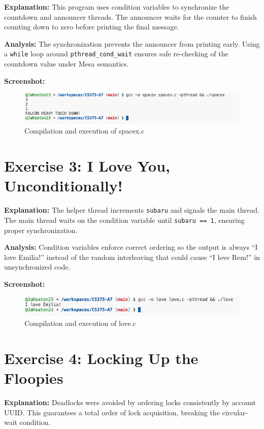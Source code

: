 \documentclass[a4paper,12pt]{article}
\begin{document}
\textbf{Explanation:}  
This program uses condition variables to synchronize the countdown and announcer threads. The announcer waits for the counter to finish counting down to zero before printing the final message.

\textbf{Analysis:}  
The synchronization prevents the announcer from printing early. Using a \texttt{while} loop around \texttt{pthread\_cond\_wait} ensures safe re-checking of the countdown value under Mesa semantics.

\textbf{Screenshot:}  
\begin{figure}[h]
\centering
\includegraphics[width=\textwidth]{spacex_output.png}
\caption{Compilation and execution of spacex.c}
\end{figure}

\section{Exercise 3: I Love You, Unconditionally!}


\textbf{Explanation:}  
The helper thread increments \texttt{subaru} and signals the main thread. The main thread waits on the condition variable until \texttt{subaru == 1}, ensuring proper synchronization.

\textbf{Analysis:}  
Condition variables enforce correct ordering so the output is always “I love Emilia!” instead of the random interleaving that could cause “I love Rem!” in unsynchronized code.

\textbf{Screenshot:}  
\begin{figure}[h]
\centering
\includegraphics[width=\textwidth]{love_output.png}
\caption{Compilation and execution of love.c}
\end{figure}

\section{Exercise 4: Locking Up the Floopies}


\textbf{Explanation:}  
Deadlocks were avoided by ordering locks consistently by account UUID. This guarantees a total order of lock acquisition, breaking the circular-wait condition.
\end{document}
